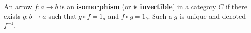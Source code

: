 An arrow $f: a \rightarrow b$ is an \textbf{isomorphism} (or is \textbf{invertible}) in a category $C$ if there exists $g: b \rightarrow a$ such that $g \circ f = 1_a$ and $f \circ g = 1_b$. Such a $g$ is unique and denoted $f^{-1}$.